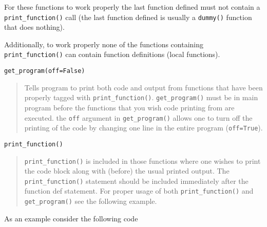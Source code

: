 \documentclass[10pt]{article}
\newcommand{\T}[1]{\texttt{#1}}
\begin{document}
For these functions to work properly the last function defined must not
contain a \T{print\_function()} call (the last function defined is usually a
\T{dummy()} function that does nothing).

Additionally, to work properly none of the functions containing \T{print\_function()}
can contain function definitions (local functions).

\T{get\_program(off=False)}
\begin{quote}
   Tells program to print both code and output from functions that have been
   properly tagged with \T{print\_function()}.  \T{get\_program()} must be in
   main program before the functions that you wish code printing from are
   executed. the \T{off} argument in \T{get\_program()} allows one to turn off
   the printing of the code by changing one line in the entire program
   (\T{off=True}).
\end{quote}

\T{print\_function()}
\begin{quote}
   \T{print\_function()} is included in those functions where one wishes to
   print the code block along with (before) the usual printed output.  The
   \T{print\_function()} statement should be included immediately after the
   function def statement.  For proper usage of both  \T{print\_function()}
   and \T{get\_program()} see the following example.
\end{quote}

As an example consider the following code
\end{document}
